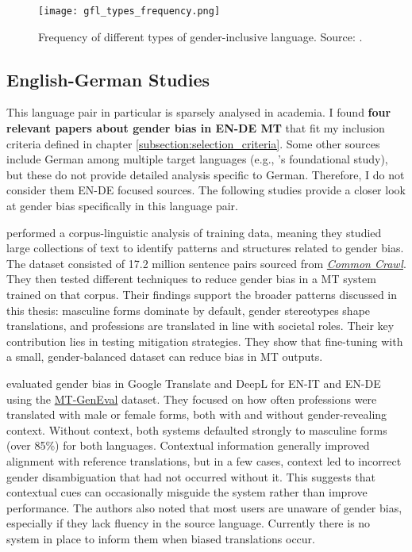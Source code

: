 \begin{figure}
	\centering
		\texttt{[image: gfl\_types\_frequency.png]}
	\caption{Frequency of different types of gender-inclusive language. Source: \citet{waldendorfWordsChangeIncrease2024}.}
	\label{fig:gfl_types_frequency}
\end{figure}


\subsection{English-German Studies}
This language pair in particular is sparsely analysed in academia. I found \textbf{four relevant papers about gender bias in EN-DE MT} that fit my inclusion criteria defined in chapter \ref{subsection:selection_criteria}. Some other sources include German among multiple target languages (e.g., \citeauthor{stanovskyEvaluatingGenderBias2019}'s foundational study), but these do not provide detailed analysis specific to German. Therefore, I do not consider them EN-DE focused sources. The following studies provide a closer look at gender bias specifically in this language pair.

\textbf{\cite{ullmannGenderBiasMachine2022}} performed a corpus-linguistic analysis of training data, meaning they studied large collections of text to identify patterns and structures related to gender bias. The dataset consisted of 17.2 million sentence pairs sourced from \href{https://commoncrawl.org/}{\textit{Common Crawl}}. They then tested different techniques to reduce gender bias in a MT system trained on that corpus. Their findings support the broader patterns discussed in this thesis: masculine forms dominate by default, gender stereotypes shape translations, and professions are translated in line with societal roles. Their key contribution lies in testing mitigation strategies. They show that fine-tuning with a small, gender-balanced dataset can reduce bias in MT outputs. 

\textbf{\citet{rescignoGenderBiasMachine2023}} evaluated gender bias in Google Translate and DeepL for EN-IT and EN-DE using the \href{https://github.com/amazon-science/machine-translation-gender-eval}{MT-GenEval} dataset. They focused on how often professions were translated with male or female forms, both with and without gender-revealing context. Without context, both systems defaulted strongly to masculine forms (over 85\%) for both languages. Contextual information generally improved alignment with reference translations, but in a few cases, context led to incorrect gender disambiguation that had not occurred without it. This suggests that contextual cues can occasionally misguide the system rather than improve performance. The authors also noted that most users are unaware of gender bias, especially if they lack fluency in the source language. Currently there is no system in place to inform them when biased translations occur.

